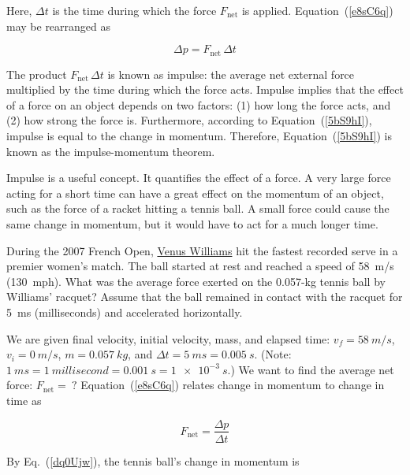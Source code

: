 \documentclass{article}
\numberwithin{equation}{section}
\numberwithin{figure}{section}
\begin{document}
Here, $\Delta t$ is the time during which the force $F_{\text{net}}$ is applied. Equation~(\ref{e8sC6q}) may be rearranged as

\begin{equation} \label{5bS9hI}
    \Delta p = F_{\text{net}}\,\Delta t
\end{equation}

The product $F_{\text{net}}\,\Delta t$ is known as \gls{impulse}: the average net external force multiplied by the time during which the force acts. Impulse implies that the effect of a force on an object depends on two factors: (1) how long the force acts, and (2) how strong the force is. Furthermore, according to Equation~(\ref{5bS9hI}), impulse is equal to the change in momentum. Therefore, Equation~(\ref{5bS9hI}) is known as the \gls{impulse-momentum theorem}.
\vspace{1em}

Impulse is a useful concept. It quantifies the effect of a force. A very large force acting for a short time can have a great effect on the momentum of an object, such as the force of a racket hitting a tennis ball. A small force could cause the same change in momentum, but it would have to act for a much longer time.

\begin{example}
    During the 2007 French Open, \href{https://youtu.be/6b1NSgQZvdo}{Venus Williams} hit the fastest recorded serve in a premier women's match. The ball started at rest and reached a speed of \SI{58}{m/s} (\SI{130}{mph}). What was the average force exerted on the 0.057-kg tennis ball by Williams' racquet? Assume that the ball remained in contact with the racquet for \SI{5}{ms} (milliseconds) and accelerated horizontally.
\end{example}

\Solution We are given final velocity, initial velocity, mass, and elapsed time: $v_f = \SI{58}{m/s}$, $v_i = \SI{0}{m/s}$, $m = \SI{0.057}{kg}$, and $\Delta t = \SI{5}{ms} = \SI{0.005}{s}$. (Note: $\SI{1}{ms} = \SI{1}{millisecond} = \SI{0.001}{s} = \SI{1e-3}{s}$.) We want to find the average net force: $F_{\text{net}} =\ ?$ Equation~(\ref{e8sC6q}) relates change in momentum to change in time as

\begin{equation*}
    F_{\text{net}} = \frac{\Delta p}{\Delta t}
\end{equation*}

By Eq.~(\ref{dq0Ujw}), the tennis ball's change in momentum is
\end{document}

